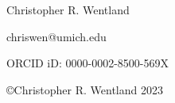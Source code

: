 \thispagestyle{empty}
\begin{center}
    Christopher R. Wentland
    
    chriswen@umich.edu
    
    ORCID iD: 0000-0002-8500-569X
    
    \vspace{1em}
    \copyright Christopher R. Wentland 2023
\end{center}
\restoregeometry
